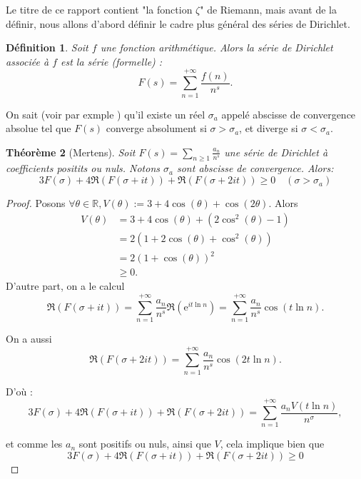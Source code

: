 \documentclass[french]{report}
\newtheorem{theorem}{Théorème}[section]
\newtheorem{definition}[theorem]{Définition}
\begin{document}
Le titre de ce rapport contient "la fonction $\zeta$" de Riemann, mais avant de la définir, nous allons d'abord définir le cadre plus général des séries de Dirichlet.

\begin{definition}\label{def:serie-dirichlet}
  Soit $f$ une fonction arithmétique. Alors la série de Dirichlet associée à $f$ est la série (formelle) :
  \[ F(s) = \sum_{n=1}^{+\infty}\frac{f(n)}{n^s}. \]
\end{definition}

On sait (voir par exmple \cite{hindry}) qu'il existe un réel $\sigma_a$ appelé abscisse de convergence absolue tel que $F(s)$ converge absolument si $\sigma>\sigma_a$, et diverge si $\sigma<\sigma_a$.

\begin{theorem}[Mertens]\label{thm:mertens-positif}
  Soit $F(s) =\sum_{n\geq1}\frac{a_n}{n^s}$ une série de Dirichlet à coefficients positits ou nuls. Notons $\sigma_a$ sont abscisse de convergence. Alors:
  \[ 3F(\sigma)+4\Re(F(\sigma+it))+\Re(F(\sigma+2it))\geq0 \quad(\sigma>\sigma_a) \]
\end{theorem}

\begin{proof}
  Posons $\forall\theta\in\mathbb{R}, V(\theta) := 3+4\cos(\theta)+\cos(2\theta)$. Alors
  \begin{align*}
    V(\theta) &= 3+4\cos(\theta)+(2\cos^2(\theta)-1) \\
              &= 2(1+2\cos(\theta)+\cos^2(\theta)) \\
              &= 2(1+\cos(\theta))^2 \\
              &\geq0.
  \end{align*}
  D'autre part, on a le calcul
  \[
    \Re(F(\sigma+it))
    =\sum_{n=1}^{+\infty}\frac{a_n}{n^s}\Re(\mathrm{e}^{it\ln n})
    =\sum_{n=1}^{+\infty}\frac{a_n}{n^s}\cos(t\ln n).
  \]

  On a aussi
  \[
    \Re(F(\sigma+2it))
    = \sum_{n=1}^{+\infty}\frac{a_n}{n^s}\cos(2t\ln n).
  \]

  D'où :
  \[
    3F(\sigma)+4\Re(F(\sigma+it))+\Re(F(\sigma+2it))
    = \sum_{n=1}^{+\infty}\frac{a_n V(t\ln n)}{n^\sigma},
  \]

  et comme les $a_n$ sont positifs ou nuls, ainsi que $V$, cela implique bien que
  \[ 3F(\sigma)+4\Re(F(\sigma+it))+\Re(F(\sigma+2it))\geq0 \]
  
\end{proof}

\end{document}
